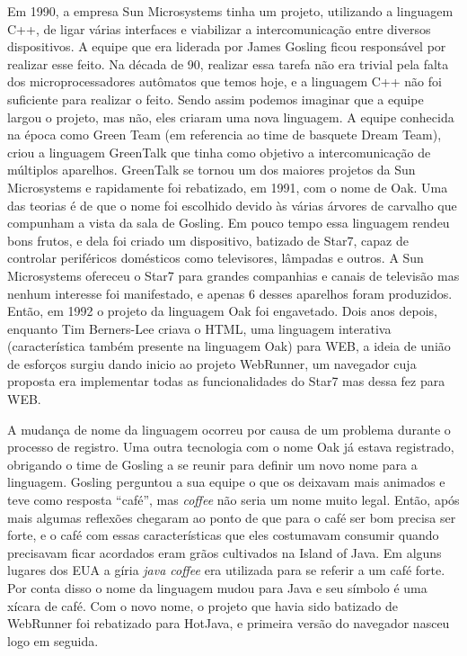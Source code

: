 \documentclass[
    12pt,               %
    openright,          %
    twoside,            %
    a4paper,            %
    brazil              %
    ]{abntex2}
\begin{document}
Em 1990, a empresa Sun Microsystems tinha um projeto, utilizando a linguagem C++,
de ligar várias interfaces e viabilizar a intercomunicação entre diversos
dispositivos.  A equipe que era liderada por James Gosling ficou responsável
por realizar esse feito. Na década de 90, realizar essa tarefa não era trivial
pela falta dos microprocessadores autômatos que temos hoje, e a linguagem C++
não foi suficiente para realizar o feito. Sendo assim podemos imaginar que a
equipe largou o projeto, mas não, eles criaram uma nova linguagem. A equipe
conhecida na época como Green Team (em referencia ao time de basquete Dream
Team), criou a linguagem GreenTalk que tinha como objetivo a intercomunicação
de múltiplos aparelhos.  GreenTalk se tornou um dos maiores projetos da Sun
Microsystems e rapidamente foi rebatizado, em 1991, com o nome de Oak. Uma das
teorias é de que o nome foi escolhido devido às várias árvores de carvalho que
compunham a vista da sala de Gosling. Em pouco tempo essa linguagem rendeu bons
frutos, e dela foi criado um dispositivo, batizado de Star7, capaz de controlar
periféricos domésticos como televisores, lâmpadas e outros. A Sun Microsystems
ofereceu o Star7 para grandes companhias e canais de televisão mas nenhum
interesse foi manifestado, e apenas 6 desses aparelhos foram produzidos. Então,
em 1992 o projeto da linguagem Oak foi engavetado.  Dois anos depois, enquanto
Tim Berners-Lee criava o HTML, uma linguagem interativa (característica também
presente na linguagem Oak) para WEB, a ideia de união de esforços surgiu dando
inicio ao projeto WebRunner, um navegador cuja proposta era implementar todas
as funcionalidades do Star7 mas dessa fez para WEB.

A mudança de nome da linguagem ocorreu por causa de um problema durante o
processo de registro.  Uma outra tecnologia com o nome Oak já estava
registrado, obrigando o time de Gosling a se reunir para definir um novo nome
para a linguagem. Gosling perguntou a sua equipe o que os deixavam mais
animados e teve como resposta “café”, mas \textit{coffee} não seria um nome muito
legal. Então, após mais algumas reflexões chegaram ao ponto de que para o café
ser bom precisa ser forte, e o café com essas características que eles
costumavam consumir quando precisavam ficar acordados eram grãos cultivados na
Island of Java. Em alguns lugares dos EUA a gíria \textit{java coffee} era
utilizada para se referir a um café forte.  Por conta disso o nome da linguagem
mudou para Java e seu símbolo é uma xícara de café.  Com o novo nome, o projeto
que havia sido batizado de WebRunner foi rebatizado para HotJava, e primeira
versão do navegador nasceu logo em seguida.
\end{document}
